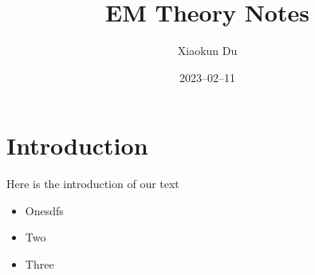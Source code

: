 \documentclass[12pt]{article}
\title{EM Theory Notes}
\author{Xiaokun Du}
\date{2023–02–11}
\begin{document}
\maketitle

\section{Introduction}

Here is the introduction of our text

\begin{itemize}

\item Onesdfs

\item Two

\item Three

\end{itemize}
\end{document}
